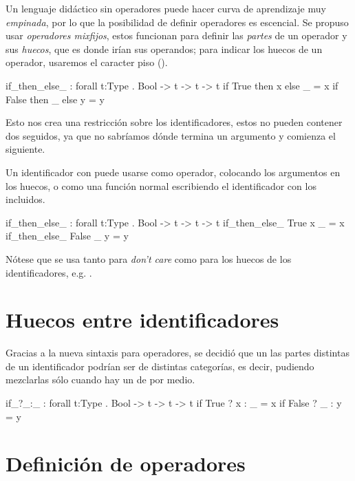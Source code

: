 \begin{designfr}
Un lenguaje didáctico sin operadores puede hacer curva de aprendizaje muy \emph{empinada}, por lo que la posibilidad de definir operadores es escencial. Se propuso usar \emph{operadores mixfijos}, estos funcionan para definir las \emph{partes} de un operador y sus \emph{huecos}, que es donde irían sus operandos; para indicar los huecos de un operador, usaremos el caracter piso (\inlinecode{\_}).

\begin{anglercode}
if_then_else_ : forall t:Type . Bool -> t -> t -> t
if True  then x else _ = x
if False then _ else y = y
\end{anglercode}

Esto nos crea una restricción sobre los identificadores, estos no pueden contener dos \inlinecode{\_} seguidos, ya que no sabríamos dónde termina un argumento y comienza el siguiente.

Un identificador con \inlinecode{\_} puede usarse como operador, colocando los argumentos en los huecos, o como una función normal escribiendo el identificador con los \inlinecode{\_} incluidos.

\begin{anglercode}
if_then_else_ : forall t:Type . Bool -> t -> t -> t
if_then_else_ True  x _ = x
if_then_else_ False _ y = y
\end{anglercode}

Nótese que se usa \inlinecode{\_} tanto para \emph{don't care} como para los huecos de los identificadores, e.g. .
\end{designfr}

\section{Huecos entre identificadores}

\begin{designfr}
Gracias a la nueva sintaxis para operadores, se decidió que un las partes distintas de un identificador podrían ser de distintas categorías, es decir, pudiendo mezclarlas sólo cuando hay un \inlinecode{\_} de por medio.

\begin{anglercode}
if_?_:_ : forall t:Type . Bool -> t -> t -> t
if True  ? x : _ = x
if False ? _ : y = y
\end{anglercode}
\end{designfr}

\section{Definición de operadores}

